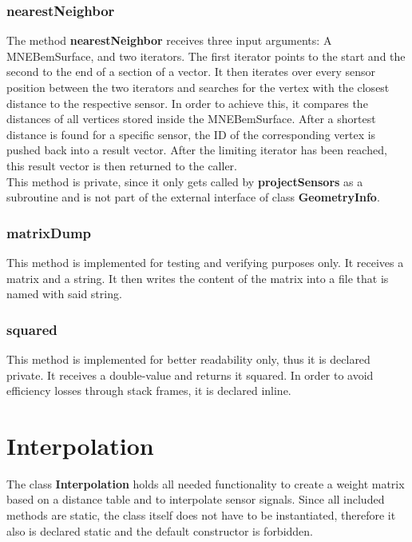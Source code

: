 \clearpage

\subsubsection{nearestNeighbor}
The method \textbf{nearestNeighbor} receives three input arguments: A MNEBemSurface, and two iterators. The first iterator points to the start and the second to the end of a section of a vector.
It then iterates over every sensor position between the two iterators and searches for the vertex with the closest distance to the respective sensor. In order to achieve this, it compares the distances of all vertices stored inside the MNEBemSurface. After a shortest distance is found for a specific sensor, the ID of the corresponding vertex is pushed back into a result vector. After the limiting iterator has been reached, this result vector is then returned to the caller.\\
This method is private, since it only gets called by \textbf{projectSensors} as a subroutine and is not part of the external interface of class \textbf{GeometryInfo}.

\subsubsection{matrixDump}
This method is implemented for testing and verifying purposes only. It receives a matrix and a string. It then writes the content of the matrix into a file that is named with said string.

\subsubsection{squared}
This method is implemented for better readability only, thus it is declared private. It receives a double-value and returns it squared. In order to avoid efficiency losses through stack frames, it is declared inline.

\clearpage


\section{Interpolation}
The class \textbf{Interpolation} holds all needed functionality to create a weight matrix based on a distance table and to interpolate sensor signals. Since all included methods are static, the class itself does not have to be instantiated, therefore it also is declared static and the default constructor is forbidden.

